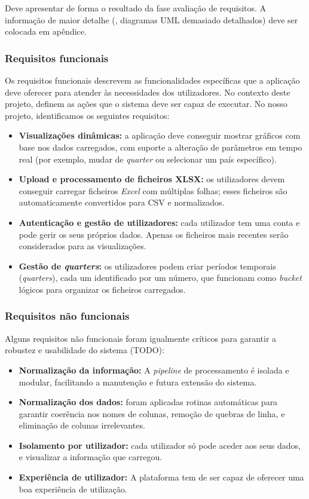 Deve apresentar de forma  o resultado da fase avaliação de requisitos. A informação de maior detalhe (\eg, diagramas UML demasiado detalhados) deve ser colocada em apêndice.

\subsubsection{Requisitos funcionais}
Os requisitos funcionais descrevem as funcionalidades específicas que a aplicação deve oferecer para atender às necessidades dos utilizadores. No contexto deste projeto, definem as ações que o sistema deve ser capaz de executar. No nosso projeto, identificamos os seguintes requisitos:

\begin{itemize}
    \item \textbf{Visualizações dinâmicas:} a aplicação deve conseguir mostrar gráficos com base nos dados carregados, com suporte a alteração de parâmetros em tempo real (por exemplo, mudar de \textit{quarter} ou selecionar um país específico).
    \item \textbf{Upload e processamento de ficheiros XLSX:} os utilizadores devem conseguir carregar ficheiros \textit{Excel} com múltiplas folhas; esses ficheiros são automaticamente convertidos para CSV e normalizados.
    \item \textbf{Autenticação e gestão de utilizadores:} cada utilizador tem uma conta e pode gerir os seus próprios dados. Apenas os ficheiros mais recentes serão considerados para as visualizações.
    \item \textbf{Gestão de \textit{quarters}:} os utilizadores podem criar períodos temporais (\textit{quarters}), cada um identificado por um número, que funcionam como \textit{bucket} lógicos para organizar os ficheiros carregados.
\end{itemize}


\subsubsection{Requisitos não funcionais}

Alguns requisitos não funcionais foram igualmente críticos para garantir a robustez e usabilidade do sistema (TODO):

\begin{itemize}
    \item \textbf{Normalização da informação: } A \textit{pipeline} de processamento é isolada e modular, facilitando a manutenção e futura extensão do sistema.
    \item \textbf{Normalização dos dados:} foram aplicadas rotinas automáticas para garantir coerência nos nomes de colunas, remoção de quebras de linha, e eliminação de colunas irrelevantes.
    \item \textbf{Isolamento por utilizador:} cada utilizador só pode aceder aos seus dados, e visualizar a informação que carregou.
    \item \textbf{Experiência de utilizador:} A plataforma tem de  ser capaz de oferecer uma boa experiência de utilização.
\end{itemize}

